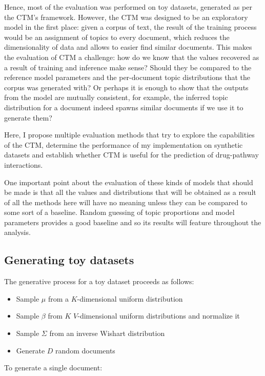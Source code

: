 \documentclass[12pt,a4paper,twoside,openright]{report}
\begin{document}
Hence, most of the evaluation was performed on toy datasets, generated as per the CTM's framework. However, the CTM was designed to be an exploratory model in the first place: given a corpus of text, the result of the training process would be an assignment of topics to every document, which reduces the dimensionality of data and allows to easier find similar documents. This makes the evaluation of CTM a challenge: how do we know that the values recovered as a result of training and inference make sense? Should they be compared to the reference model parameters and the per-document topic distributions that the corpus was generated with? Or perhaps it is enough to show that the outputs from the model are mutually consistent, for example, the inferred topic distribution for a document indeed spawns similar documents if we use it to generate them?

Here, I propose multiple evaluation methods that try to explore the capabilities of the CTM, determine the performance of my implementation on synthetic datasets and establish whether CTM is useful for the prediction of drug-pathway interactions.

One important point about the evaluation of these kinds of models that should be made is that all the values and distributions that will be obtained as a result of all the methods here will have no meaning unless they can be compared to some sort of a baseline. Random guessing of topic proportions and model parameters provides a good baseline and so its results will feature throughout the analysis.

\subsection{Generating toy datasets}

The generative process for a toy dataset proceeds as follows:

\begin{itemize}[noitemsep]
\item Sample $\mu$ from a $K$-dimensional uniform distribution
\item Sample $\beta$ from $K$ $V$-dimensional uniform distributions and normalize it
\item Sample $\Sigma$ from an inverse Wishart distribution
\item Generate $D$ random documents
\end{itemize}

To generate a single document:
\end{document}
